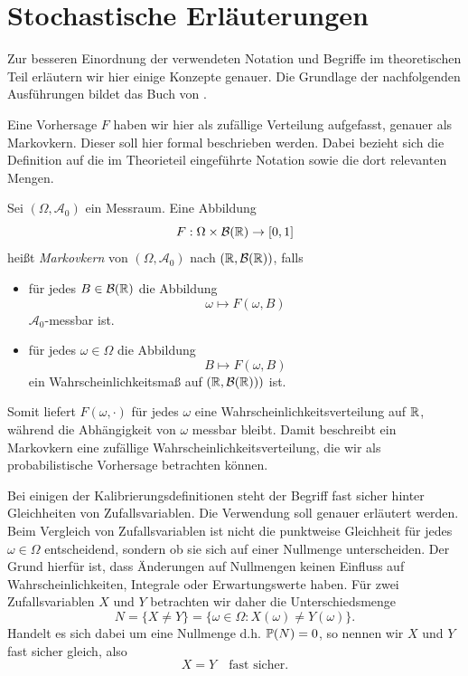 \chapter{Stochastische Erläuterungen} \label{seq:stoch_explain}
Zur besseren Einordnung der verwendeten Notation und Begriffe im theoretischen Teil erläutern wir hier einige Konzepte genauer.
Die Grundlage der nachfolgenden Ausführungen bildet das Buch von \textcite{klenke2020wahrscheinlichkeitstheorie}. 

Eine Vorhersage $F$ haben wir hier als zufällige Verteilung aufgefasst, genauer als Markovkern. Dieser soll hier formal beschrieben werden. Dabei bezieht sich die Definition auf die im Theorieteil eingeführte Notation sowie die dort relevanten Mengen. 

\begin{defi}
    Sei $(\Omega,\mathcal{A}_0)$ ein Messraum. Eine Abbildung
    \[
    F:\Omega\times\mathcal{B}(\mathbb{R})\to[0,1]
    \]
    heißt \emph{Markovkern} von $(\Omega,\mathcal{A}_0)$ nach $(\mathbb{R},\mathcal{B}(\mathbb{R}))$, falls
    \begin{itemize}
        \item für jedes $B\in \mathcal{B}(\mathbb{R})$ die Abbildung  \[\omega\mapsto F(\omega,B)\] $\mathcal{A}_0$-messbar ist.

    \item für jedes $\omega\in\Omega$ die Abbildung
    \[
    B\mapsto F(\omega,B)
    \]
    ein Wahrscheinlichkeitsmaß auf $(\mathbb{R},\mathcal{B}(\mathbb{R})))$ ist.
\end{itemize}
\end{defi}
Somit liefert $F(\omega,\cdot)$ für jedes $\omega$ eine Wahrscheinlichkeitsverteilung auf $\mathbb{R}$, während die Abhängigkeit von $\omega$ messbar bleibt. Damit beschreibt ein Markovkern eine zufällige Wahrscheinlichkeitsverteilung, die wir als probabilistische Vorhersage betrachten können.

Bei einigen der Kalibrierungsdefinitionen steht der Begriff \glqq fast sicher\grqq{} hinter Gleichheiten von Zufallsvariablen. Die Verwendung soll genauer erläutert werden. Beim Vergleich von Zufallsvariablen ist nicht die punktweise Gleichheit für jedes $\omega\in\Omega$ entscheidend, sondern ob sie sich auf einer Nullmenge unterscheiden. Der Grund hierfür ist, dass Änderungen auf Nullmengen keinen Einfluss auf Wahrscheinlichkeiten, Integrale oder Erwartungswerte haben.
Für zwei Zufallsvariablen $X$ und $Y$ betrachten wir daher die Unterschiedsmenge
\[
N=\{X\neq Y\}=\{\omega \in \Omega: X(\omega)\neq Y(\omega)\}.
\]
Handelt es sich dabei um eine Nullmenge d.h. $\mathbb{P}(N)=0$, so nennen wir $X$ und $Y$ fast sicher gleich, also
\[
X = Y \quad \text{fast sicher}.
\]

